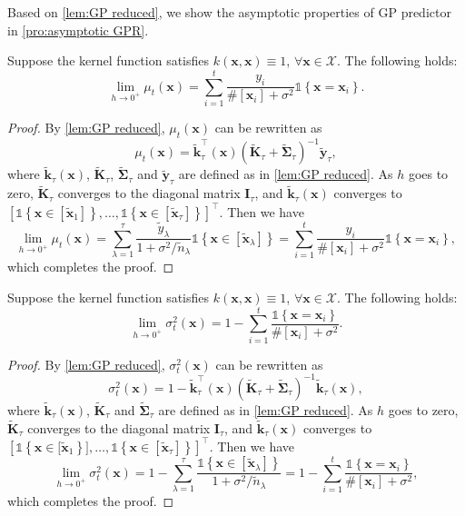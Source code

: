 \documentclass[11pt,en]{elegantpaper}
\newcommand{\domain}{\mathcal{X}}
\newcommand{\x}{\bm{x}}
\newcommand{\y}{\bm{y}}
\newcommand{\K}{\bm{K}}
\renewcommand{\k}{\bm{k}}
\newcommand{\1}{\mathds{1}}
\newcommand{\set}[1]{\left\{#1\right\}}
\begin{document}
Based on \cref{lem:GP reduced}, we show the asymptotic properties of GP predictor in \cref{pro:asymptotic GPR}.

\begin{proposition}
    \label{pro:asymptotic GPR}
    Suppose the kernel function satisfies $k(\x, \x) \equiv 1$, $\forall \x \in \domain$. The following holds:
    \begin{equation}
        \lim_{h \to 0^+} \mu_t(\x) = \sum_{i=1}^{t} \dfrac{y_i}{\#[\x_i] + \sigma^2} \1{\set{\x = \x_i}}.
    \end{equation}
\end{proposition}

\begin{proof}
    By \cref{lem:GP reduced}, $\mu_t(\x)$ can be rewritten as
    \[
        \mu_t(\x) = \tilde{\k}_{\tau}^{\top}(\x) (\tilde{\K}_{\tau} + \tilde{\bm{\Sigma}}_{\tau})^{-1} \tilde{\y}_{\tau},
    \]
    where $\tilde{\k}_{\tau}(\x)$, $\tilde{\K}_{\tau}$, $\tilde{\bm{\Sigma}}_{\tau}$ and $\tilde{\y}_{\tau}$ are defined as in \cref{lem:GP reduced}.
    As $h$ goes to zero, $\tilde{\K}_{\tau}$ converges to the diagonal matrix $\bm{I}_{\tau}$, and $\tilde{\k}_{\tau}(\x)$ converges to $[\1{\set{\x \in [\tilde{\x}_1]}}, \dots, \1{\set{\x \in [\tilde{\x}_{\tau}]}}]^{\top}$.
    Then we have
    \[
        \lim_{h \to 0^+} \mu_t(\x)
        = \sum_{\lambda=1}^{\tau} \dfrac{\tilde{y}_{\lambda}}{1 + \sigma^2 / \tilde{n}_{\lambda}} \1\set{\x \in [\tilde{\x}_{\lambda}]}
        = \sum_{i=1}^{t} \dfrac{y_i}{\#[\x_i] + \sigma^2} \1\set{\x = \x_i},
    \]
    which completes the proof.
\end{proof}


\begin{proposition}
    \label{pro:asymptotic GP Var}
    Suppose the kernel function satisfies $k(\x, \x) \equiv 1$, $\forall \x \in \domain$. The following holds:
    \begin{equation}
        \lim_{h \to 0^+} \sigma^2_t(\x) = 1 - \sum_{i=1}^{t} \dfrac{\1\set{\x = \x_i}}{\#[\x_i] + \sigma^2}.
    \end{equation}
\end{proposition}

\begin{proof}
    By \cref{lem:GP reduced}, $\sigma^2_t(\x)$ can be rewritten as
    \[
        \sigma^2_t(\x) = 1 - \tilde{\k}_{\tau}^{\top}(\x) (\tilde{\K}_{\tau} + \tilde{\bm{\Sigma}}_{\tau})^{-1} \tilde{\k}_{\tau}(\x),
    \]
    where $\tilde{\k}_{\tau}(\x)$, $\tilde{\K}_{\tau}$ and $\tilde{\bm{\Sigma}}_{\tau}$ are defined as in \cref{lem:GP reduced}.
    As $h$ goes to zero, $\tilde{\K}_{\tau}$ converges to the diagonal matrix $\bm{I}_{\tau}$, and $\tilde{\k}_{\tau}(\x)$ converges to $[\1{\set{\x \in [\tilde{\x}_1}]}, \dots, \1{\set{\x \in [\tilde{\x}_{\tau}]}}]^{\top}$.
    Then we have
    \[
        \lim_{h \to 0^+} \sigma^2_t(\x)
        = 1 - \sum_{\lambda=1}^{\tau} \dfrac{\1\set{\x \in [\tilde{\x}_{\lambda}]}}{1 + \sigma^2 / \tilde{n}_{\lambda}}
        = 1 - \sum_{i=1}^{t} \dfrac{\1\set{\x = \x_i}}{\#[\x_i] + \sigma^2},
    \]
    which completes the proof.
\end{proof}
\end{document}
